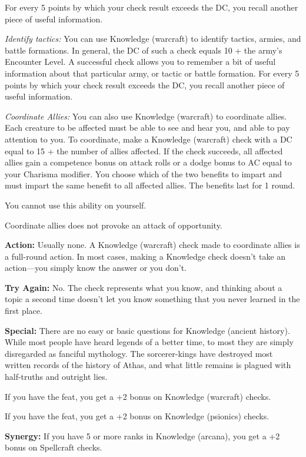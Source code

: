For every 5 points by which your check result exceeds the DC, you recall another piece of useful information.

\textit{Identify tactics:} You can use Knowledge (warcraft) to identify tactics, armies, and battle formations. In general, the DC of such a check equals 10 + the army's Encounter Level. A successful check allows you to remember a bit of useful information about that particular army, or tactic or battle formation. For every 5 points by which your check result exceeds the DC, you recall another piece of useful information.

\textit{Coordinate Allies:} You can also use Knowledge (warcraft) to coordinate allies. Each creature to be affected must be able to see and hear you, and able to pay attention to you. To coordinate, make a Knowledge (warcraft) check with a DC equal to 15 + the number of allies affected. If the check succeeds, all affected allies gain a competence bonus on attack rolls or a dodge bonus to AC equal to your Charisma modifier. You choose which
of the two benefits to impart and must impart the same benefit to all affected allies. The benefits last for 1 round.

You cannot use this ability on yourself.

Coordinate allies does not provoke an attack of opportunity.

\textbf{Action:} Usually none. A Knowledge (warcraft) check made to coordinate allies is a full-round action. In most cases, making a Knowledge check doesn't take an action---you simply know the answer or you don't.

\textbf{Try Again:} No. The check represents what you know, and thinking about a topic a second time doesn't let you know something that you never learned in the first place.

\textbf{Special:} There are no easy or basic questions for Knowledge (ancient history). While most people have heard legends of a better time, to most they are simply disregarded as fanciful mythology. The sorcerer-kings have destroyed most written records of the history of Athas, and what little remains is plagued with half-truths and outright lies.

If you have the  feat, you get a +2 bonus on Knowledge (warcraft) checks.

If you have the  feat, you get a +2 bonus on Knowledge (psionics) checks.

\textbf{Synergy:} If you have 5 or more ranks in Knowledge (arcana), you get a +2 bonus on Spellcraft checks.

